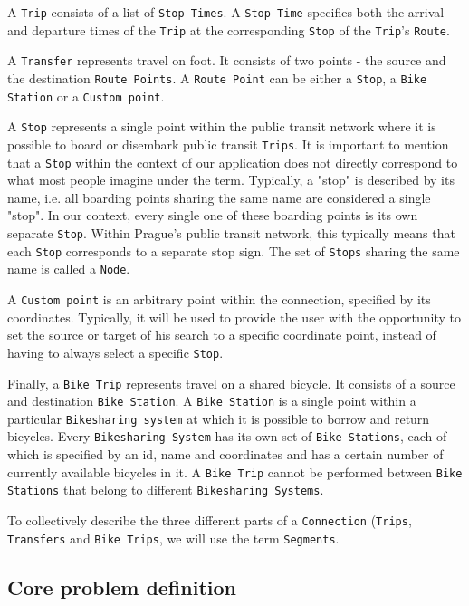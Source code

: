 A \texttt{Trip} consists of a list of \texttt{Stop Times}. A \texttt{Stop Time} specifies both the arrival and departure times of the \texttt{Trip} at the corresponding \texttt{Stop} of the \texttt{Trip}'s \texttt{Route}.

A \texttt{Transfer} represents travel on foot. It consists of two points - the source and the destination \texttt{Route Points}. A \texttt{Route Point} can be either a \texttt{Stop}, a \texttt{Bike Station} or a \texttt{Custom point}.

A \texttt{Stop} represents a single point within the public transit network where it is possible to board or disembark public transit \texttt{Trips}. It is important to mention that a \texttt{Stop} within the context of our application does not directly correspond to what most people imagine under the term. Typically, a "stop" is described by its name, i.e. all boarding points sharing the same name are considered a single "stop". In our context, every single one of these boarding points is its own separate \texttt{Stop}. Within Prague's public transit network, this typically means that each \texttt{Stop} corresponds to a separate stop sign. The set of \texttt{Stops} sharing the same name is called a \texttt{Node}.

A \texttt{Custom point} is an arbitrary point within the connection, specified by its coordinates. Typically, it will be used to provide the user with the opportunity to set the source or target of his search to a specific coordinate point, instead of having to always select a specific \texttt{Stop}.

Finally, a \texttt{Bike Trip} represents travel on a shared bicycle. It consists of a source and destination \texttt{Bike Station}. A \texttt{Bike Station} is a single point within a particular \texttt{Bikesharing system} at which it is possible to borrow and return bicycles. Every \texttt{Bikesharing System} has its own set of \texttt{Bike Stations}, each of which is specified by an id, name and coordinates and has a certain number of currently available bicycles in it. A \texttt{Bike Trip} cannot be performed between \texttt{Bike Stations} that belong to different \texttt{Bikesharing Systems}.

To collectively describe the three different parts of a \texttt{Connection} (\texttt{Trips}, \texttt{Transfers} and \texttt{Bike Trips}, we will use the term \texttt{Segments}.


\subsection{Core problem definition}

